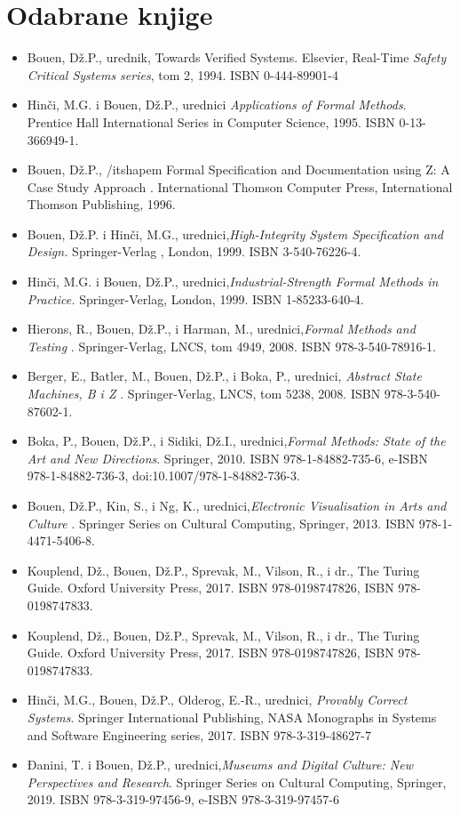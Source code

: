 \documentclass[a4paper]{article}
\begin{document}
\section{Odabrane knjige}


\begin{itemize}
\item Bouen, Dž.P., urednik, Towards Verified Systems. Elsevier, Real-Time {\itshape Safety Critical Systems series}, tom 2, 1994. ISBN 0-444-89901-4
\item Hinči, M.G. i Bouen, Dž.P., urednici {\itshape Applications of Formal Methods}. Prentice Hall International Series in Computer Science, 1995. ISBN 0-13-366949-1.
\item Bouen, Dž.P., {/itshapem Formal Specification and Documentation using Z: A Case Study Approach }. International Thomson Computer Press, International Thomson Publishing, 1996. 
\item Bouen, Dž.P. i Hinči, M.G., urednici,{\itshape High-Integrity System Specification and Design. }Springer-Verlag , London, 1999. ISBN 3-540-76226-4.
\item Hinči, M.G. i Bouen, Dž.P., urednici,{\itshape Industrial-Strength Formal Methods in Practice. } Springer-Verlag, London, 1999. ISBN 1-85233-640-4.
\item Hierons, R., Bouen, Dž.P., i Harman, M., urednici,{\itshape  Formal Methods and Testing} . Springer-Verlag, LNCS, tom 4949, 2008. ISBN 978-3-540-78916-1.
\item Berger, E., Batler, M., Bouen, Dž.P., i Boka, P., urednici, {\itshape Abstract State Machines, B i Z }. Springer-Verlag, LNCS, tom 5238, 2008. ISBN 978-3-540-87602-1.
\item Boka, P., Bouen, Dž.P., i Sidiki, Dž.I., urednici,{\itshape Formal Methods: State of the Art and New Directions}. Springer, 2010. ISBN 978-1-84882-735-6, e-ISBN 978-1-84882-736-3, doi:10.1007/978-1-84882-736-3.
\item Bouen, Dž.P., Kin, S., i Ng, K., urednici,{\itshape Electronic Visualisation in Arts and Culture} . Springer Series on Cultural Computing, Springer, 2013. ISBN 978-1-4471-5406-8.
\item Kouplend, Dž., Bouen, Dž.P., Sprevak, M., Vilson, R., i dr., The Turing Guide. Oxford University Press, 2017. ISBN 978-0198747826, ISBN 978-0198747833.
\item Kouplend, Dž., Bouen, Dž.P., Sprevak, M., Vilson, R., i dr., The Turing Guide. Oxford University Press, 2017. ISBN 978-0198747826, ISBN 978-0198747833.
\item Hinči, M.G., Bouen, Dž.P., Olderog, E.-R., urednici, {\itshape Provably Correct Systems}. Springer International Publishing, NASA Monographs in Sy\-stems and Software Engineering series, 2017. ISBN 978-3-319-48627-7
\item Đanini, T. i Bouen, Dž.P., urednici,{\itshape Museums and Digital Culture: New Perspectives and Research}. Springer Series on Cultural Computing, Springer, 2019. ISBN 978-3-319-97456-9, e-ISBN 978-3-319-97457-6
\end{itemize}
\end{document}
